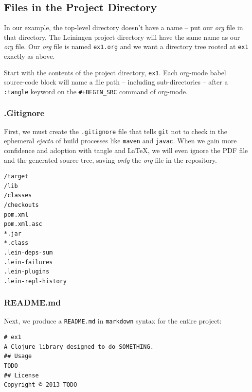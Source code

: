 \documentclass[11pt]{article}
\begin{document}
\subsection{Files in the Project Directory}
\label{sec-2-1}
In our example, the top-level directory doesn't have a name -- 
put our \emph{org} file in that directory. The Leiningen project directory
will have the same name as our \emph{org} file. Our \emph{org} file is named
\verb+ex1.org+ and we want a directory tree rooted at \verb+ex1+
exactly as above.

Start with the contents of the project directory, \verb+ex1+. Each
org-mode babel source-code block will name a file path -- including
sub-directories -- after a \verb+:tangle+ keyword on the
\texttt{\#+BEGIN\_SRC} command of org-mode.
\subsubsection{.Gitignore}
\label{sec-2-1-1}
First, we must create the \verb+.gitignore+ file that tells
\verb+git+ not to check in the ephemeral \emph{ejecta} of build
processes like \verb+maven+ and \verb+javac+. When we gain more
confidence and adoption with tangle and \LaTeX{}, we will even
ignore the PDF file and the generated source tree, saving \emph{only}
the \emph{org} file in the repository.
\begin{verbatim}
/target
/lib
/classes
/checkouts
pom.xml
pom.xml.asc
*.jar
*.class
.lein-deps-sum
.lein-failures
.lein-plugins
.lein-repl-history
\end{verbatim}

\subsubsection{README.md}
\label{sec-2-1-2}
Next, we produce a \verb+README.md+ in \verb+markdown+ syntax for
the entire project:
\begin{verbatim}
# ex1
A Clojure library designed to do SOMETHING. 
## Usage
TODO
## License
Copyright © 2013 TODO
\end{verbatim}
\end{document}
